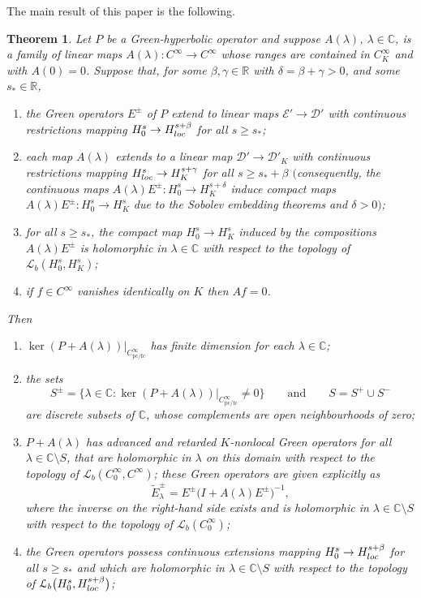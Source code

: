 \documentclass[11pt]{article}
\numberwithin{equation}{section}
\numberwithin{equation}{section}
\newtheorem{Theorem}{Theorem}[section]
\newcommand{\CC}{{\mathbb C}}
\newcommand{\RR}{{\mathbb R}}
\newcommand{\fc}{\mathrm{fc}}
\newcommand{\pc}{\mathrm{pc}}
\newcommand{\DD}{{\mathscr D}}
\newcommand{\EE}{{\mathscr E}}
\newcommand{\LL}{{\mathcal L}}
\newcommand{\loc}{{\rm loc}}
\begin{document}
 The main result of this paper is the following.
 \begin{Theorem} \label{thm:GHpert}
 	Let $P$ be a Green-hyperbolic operator and
 	suppose $A(\lambda)$, $\lambda\in\CC$, is a family of linear maps $A(\lambda)\colon C^\infty\to C^\infty$ whose ranges are contained in $C^\infty_K$ and with $A(0)=0$. Suppose that,
 	for some $\beta,\gamma\in \RR$ with $\delta=\beta+\gamma>0$, and some $s_*\in \RR$,
 	\begin{enumerate}\itemsep=0pt
 		\item[$(a)$] the Green operators $E^\pm$ of $P$ extend to linear maps
 		$\EE'\to \DD'$ with continuous restrictions mapping $H^s_0\to H^{s+\beta}_\loc$ for all $s\ge s_*$;
 		\item[$(b)$] each map $A(\lambda)$ extends to a linear map $\DD'\to\DD'_K$ with continuous restrictions mapping $H^s_\loc\to H^{s+\gamma}_K$ for all $s\ge s_*+\beta$
 		$($consequently, the continuous maps $A(\lambda)E^\pm\colon H_0^s\to H_K^{s+\delta}$ induce
 		compact maps $A(\lambda)E^\pm\colon H_0^s\to H_K^{s}$ due to the Sobolev embedding theorems and $\delta>0)$;
 		\item[$(c)$] for all $s\ge s_*$, the compact map $H^s_0\to H^s_K$ induced by the compositions $A(\lambda)E^\pm$ is holomorphic in $\lambda\in\CC$ with respect to the topology of $\LL_b(H^s_0,H^s_K)$;
 		\item[$(d)$] if $f\in C^\infty$ vanishes identically on $K$ then $Af=0$.
 	\end{enumerate}
 	Then
 	\begin{enumerate}\renewcommand{\labelenumi}{(\Alph{enumi}).}
 		\item[$(A)$] $\ker (P+ A(\lambda))|_{C^\infty_{\pc/\fc}}$ has finite dimension
 		for each $\lambda\in\CC$;
 		\item[$(B)$]%
 the sets
 		\begin{equation*}
 			S^\pm = \big\{\lambda\in \CC\colon \ker (P+ A(\lambda))|_{C^\infty_{\pc/\fc}}\neq 0\big\} \qquad \text{and}\qquad
 			S = S^+\cup S^-
 		\end{equation*}
 		are discrete subsets of $\CC$, whose complements are open neighbourhoods of zero;
 		\item[$(C)$]%
 $P+A(\lambda)$ has advanced and retarded $K$-nonlocal Green operators for all $\lambda\in\CC\setminus S$, that are holomorphic in $\lambda$ on this domain with respect to the topology of $\LL_b(C_0^\infty, C^\infty)$; these Green operators are given explicitly as
 		\begin{equation*}
 			\tilde{E}_{\lambda}^\pm = E^\pm \big(I+A(\lambda)E^\pm\big)^{-1},
 		\end{equation*}
 		where the inverse on the right-hand side exists and is holomorphic in $\lambda\in \CC\setminus S$
 		with respect to the topology of $\LL_b(C_0^\infty)$;
 		\item[$(D)$]%
 the Green operators
 		possess continuous extensions mapping $H^s_0\to H^{s+\beta}_\loc$ for all $s\ge s_*$ and which are holomorphic in $\lambda\in\CC\setminus S$ with respect to the topology of $\LL_b\big(H^s_0,H^{s+\beta}_\loc\big)$;
 		

\end{enumerate}
\end{Theorem}
\end{document}
